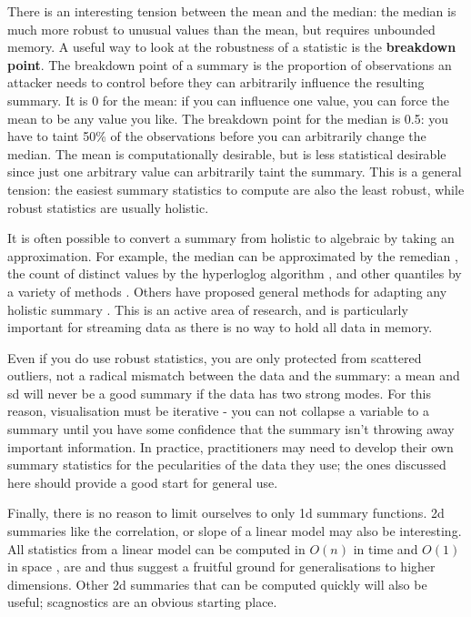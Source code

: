 \documentclass[journal]{vgtc}                %
\begin{document}
There is an interesting tension between the mean and the median: the median is much more robust to unusual values than the mean, but requires unbounded memory. A useful way to look at the robustness of a statistic is the {\bf breakdown point}. The breakdown point of a summary is the proportion of observations an attacker needs to control before they can arbitrarily influence the resulting summary. It is 0 for the mean: if you can influence one value, you can force the mean to be any value you like. The breakdown point for the median is 0.5: you have to taint 50\% of the observations before you can arbitrarily change the median. The mean is computationally desirable, but is less statistical desirable since just one arbitrary value can arbitrarily taint the summary.  This is a general tension: the easiest summary statistics to compute are also the least robust, while robust statistics are usually holistic.

It is often possible to convert a summary from holistic to algebraic by taking an approximation. For example, the median can be approximated by the remedian \citep{rousseeuw:1990}, the count of distinct values by the hyperloglog  algorithm \citep{flajolet:2007}, and other quantiles by a variety of methods \citep{finkelstein:1994,hurley:1995,liechty:2003}. Others have proposed general methods for adapting any holistic summary \citep{christmann:2007}. This is an active area of research, and is particularly important for streaming data as there is no way to hold all data in memory.  


Even if you do use robust statistics, you are only protected from scattered outliers, not a radical mismatch between the data and the summary: a mean and sd will never be a good summary if the data has two strong modes. For this reason, visualisation must be iterative - you can not collapse a variable to a summary until you have some confidence that the summary isn't throwing away important information. In practice, practitioners may need to develop their own summary statistics for the pecularities of the data they use; the ones discussed here should provide a good start for general use.

Finally, there is no reason to limit ourselves to only 1d summary functions. 2d summaries like the correlation, or slope of a linear model may also be interesting. All statistics from a linear model can be computed in $O(n)$ in time and $O(1)$ in space \citep{miller:1992}, are and thus suggest a fruitful ground for generalisations to higher dimensions. Other 2d summaries that can be computed quickly will also be useful; scagnostics \citep{wilkinson:2005} are an obvious starting place.
\end{document}
